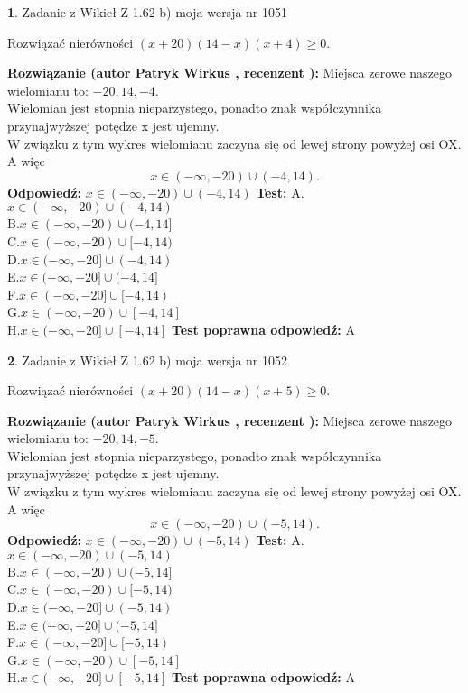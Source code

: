 \documentclass[12pt, a4paper]{article}
\theoremstyle{definition} %
\newtheorem{zad}{}
\newcommand{\zadStart}[1]{\begin{zad}#1\newline}
\newcommand{\zadStop}{\end{zad}}
\newcommand{\rozwStart}[2]{\noindent \textbf{Rozwiązanie (autor #1 , recenzent #2): }\newline}
\newcommand{\rozwStop}{\newline}
\newcommand{\odpStart}{\noindent \textbf{Odpowiedź:}\newline}
\newcommand{\odpStop}{\newline}
\newcommand{\testStart}{\noindent \textbf{Test:}\newline}
\newcommand{\testStop}{\newline}
\newcommand{\kluczStart}{\noindent \textbf{Test poprawna odpowiedź:}\newline}
\newcommand{\kluczStop}{\newline}
\begin{document}
\zadStart{Zadanie z Wikieł Z 1.62 b) moja wersja nr 1051}

Rozwiązać nierówności $(x+20)(14-x)(x+4)\ge0$.
\zadStop
\rozwStart{Patryk Wirkus}{}
Miejsca zerowe naszego wielomianu to: $-20, 14, -4$.\\
Wielomian jest stopnia nieparzystego, ponadto znak współczynnika przy\linebreak najwyższej potędze x jest ujemny.\\ W związku z tym wykres wielomianu zaczyna się od lewej strony powyżej osi OX. A więc $$x \in (-\infty,-20) \cup (-4,14).$$
\rozwStop
\odpStart
$x \in (-\infty,-20) \cup (-4,14)$
\odpStop
\testStart
A.$x \in (-\infty,-20) \cup (-4,14)$\\
B.$x \in (-\infty,-20) \cup (-4,14]$\\
C.$x \in (-\infty,-20) \cup [-4,14)$\\
D.$x \in (-\infty,-20] \cup (-4,14)$\\
E.$x \in (-\infty,-20] \cup (-4,14]$\\
F.$x \in (-\infty,-20] \cup [-4,14)$\\
G.$x \in (-\infty,-20) \cup [-4,14]$\\
H.$x \in (-\infty,-20] \cup [-4,14]$
\testStop
\kluczStart
A
\kluczStop



\zadStart{Zadanie z Wikieł Z 1.62 b) moja wersja nr 1052}

Rozwiązać nierówności $(x+20)(14-x)(x+5)\ge0$.
\zadStop
\rozwStart{Patryk Wirkus}{}
Miejsca zerowe naszego wielomianu to: $-20, 14, -5$.\\
Wielomian jest stopnia nieparzystego, ponadto znak współczynnika przy\linebreak najwyższej potędze x jest ujemny.\\ W związku z tym wykres wielomianu zaczyna się od lewej strony powyżej osi OX. A więc $$x \in (-\infty,-20) \cup (-5,14).$$
\rozwStop
\odpStart
$x \in (-\infty,-20) \cup (-5,14)$
\odpStop
\testStart
A.$x \in (-\infty,-20) \cup (-5,14)$\\
B.$x \in (-\infty,-20) \cup (-5,14]$\\
C.$x \in (-\infty,-20) \cup [-5,14)$\\
D.$x \in (-\infty,-20] \cup (-5,14)$\\
E.$x \in (-\infty,-20] \cup (-5,14]$\\
F.$x \in (-\infty,-20] \cup [-5,14)$\\
G.$x \in (-\infty,-20) \cup [-5,14]$\\
H.$x \in (-\infty,-20] \cup [-5,14]$
\testStop
\kluczStart
A
\kluczStop
\end{document}

